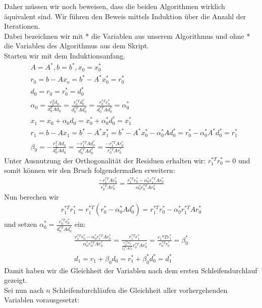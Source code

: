 Daher müssen wir noch beweisen, dass die beiden Algorithmen wirklich äquivalent sind.
Wir führen den Beweis mittels Induktion über die Anzahl der Iterationen. \\
Dabei bezeichnen wir mit * die Variablen aus unserem Algorithmus und ohne * die Variablen des Algorithmus
aus dem Skript. \\
Starten wir mit dem Induktionsanfang. \\
\begin{align*}
   &A = A^*, b = b^*, x_0 = x_0^* \\
   &r_0 = b - Ax_o = b^* - A^*x_0^* = r_0^* \\
   &d_0 = r_0 = r_0^* = d_0^* \\
   &\alpha_0 = \frac{r_0^Td_0}{d_0^TAd_0} = \frac{r_0^{*T}d_0^*}{d_0^{*T}Ad_0^*} = \frac{r_0^{*T}r_0^*}{d_0^{*T}Ad_0^*} = \alpha_0^* \\
   &x_1 = x_0 + \alpha_0d_0 = x_0^* + \alpha_0^*d_0^* = x_1^* \\
   &r_1 = b - Ax_1 = b^* - A^*x_1^* = b^* - A^*x_0^* - \alpha_0^*Ad_0^* = r_0^* - \alpha_0^*A^*d_0^* = r_1^* \\
   &\beta_0 = - \frac{r_1^TAd_0}{d_0^TAd_0} = \frac{-r_1^{*T}Ad_0^*}{d_0^{*T}Ad_0^*} = \frac{-r_1^{*T}Ar_0^*}{r_0^{*T}Ar_0^*}
\end{align*}
Unter Ausnutzung der Orthogonalität der Residuen erhalten wir: $r_1^{*T}r_0^* = 0$ und somit können wir den Bruch
folgendermaßen erweitern:
\begin{align*}
  \frac{-r_1^{*T}Ar_0^*}{r_0^{*T}Ar_0^*} = \frac{r_1^{*T}r_0^* -\alpha_0^*r_1^{*T}Ar_0^*}{\alpha_0^*r_0^{*T}Ar_0^*}
\end{align*}
Nun berechen wir
\begin{align*}
  r_1^{*T}r_1^* = r_1^{*T}(r_0^*-\alpha_0^*Ad_0^*) = r_1^{*T}r_0^* - \alpha_0^*r_1^{*T}Ar_0^*
\end{align*}
und setzen $\alpha_0^* = \frac{r_0^{*T}r_0^*}{d_0^{*T}Ad_0^*}$ ein:
\begin{align*}
  \frac{r_1^{*T}r_0^* -\alpha_0^*r_1^{*T}Ar_0^*}{\alpha_0^*r_0^{*T}Ar_0^*} = \frac{r_1^{*T}r_1^*}{\frac{r_0^{*T}r_0^*}{r_0^{*T}Ar_0^*}r_0^{*T}Ar_0^*}
  = \frac{r_1{*T}r_1^*}{r_0^{*T}r_0^*} = \beta_0^* \\
  d_1 = r_1 + \beta_0d_0 = r_1^* + \beta_0^*d_0^* = d_1^*
\end{align*}
Damit haben wir die Gleichheit der Variablen nach dem ersten Schleifendurchlauf gezeigt. \\
Sei nun nach $n$ Schleifendurchläufen die Gleichheit aller vorhergehenden Variablen vorausgesetzt: \\

